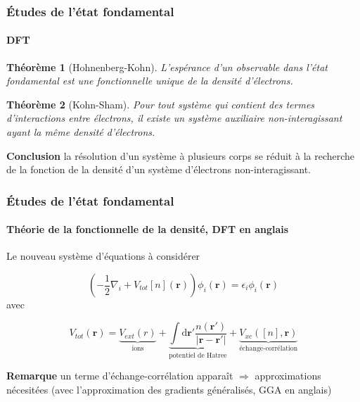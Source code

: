 \documentclass[a4paper, 12pt, twoside, titlepage, french]{beamer}
\newcommand{\dd}[0]{\textrm{d}}
\newtheorem{theoreme}{Théorème}
\begin{document}
\begin{frame}
\frametitle{Études de l'état fondamental}
\framesubtitle{DFT}
\begin{theoreme}[Hohnenberg-Kohn]
  L'espérance d'un observable dans l'état fondamental est une fonctionnelle unique
  de la densité d'électrons.
\end{theoreme}

\begin{theoreme}[Kohn-Sham]
  Pour tout système qui contient des termes d'interactions entre électrons,
  il existe un système auxiliaire non-interagissant ayant la même densité d'électrons.
\end{theoreme}

\textbf{Conclusion} la résolution d'un système à plusieurs corps se réduit à la recherche de la fonction de la densité d'un système d'électrons non-interagissant.
\end{frame}
\newpage
\begin{frame}
\frametitle{Études de l'état fondamental}
\framesubtitle{Théorie de la fonctionnelle de la densité, DFT en anglais}
Le nouveau système d'équations à considérer

\begin{equation}
  (-\frac{1}{2}\nabla_i + V_{tot}[n](\textbf{r}))\phi_i(\textbf{r}) = \epsilon_i\phi_i(\textbf{r})
\end{equation}
avec

\begin{equation}
  V_{tot}(\textbf{r}) = \underbrace{V_{ext}(r)}_\text{ions}
  + \underbrace{\int \dd \textbf{r}' \frac{n(\textbf{r}')}{|\textbf{r} - \textbf{r}'|}}_\text{potentiel de Hatree}
  + \underbrace{V_{xc}([n], \textbf{r})}_\text{échange-corrélation}
\end{equation}

\textbf{Remarque} un terme d'échange-corrélation apparaît $\Longrightarrow$ approximations nécesitées (avec l'approximation des gradients généralisés, GGA en anglais)
\end{frame}
\newpage
\end{document}
